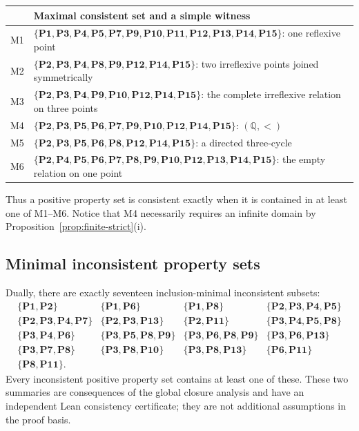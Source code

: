 \documentclass[11pt,a4paper,reqno]{amsart}
\theoremstyle{definition}
\theoremstyle{remark}
\newcommand{\prop}[1]{\textbf{P#1}}
\begin{document}
\begin{center}
\small
\begin{tabular}{@{}cl@{}}
\toprule
 & Maximal consistent set and a simple witness \\
\midrule
M1 &
$\{\prop{1},\prop{3},\prop{4},\prop{5},\prop{7},\prop{9},\prop{10},
\prop{11},\prop{12},\prop{13},\prop{14},\prop{15}\}$:
one reflexive point \\[2pt]
M2 &
$\{\prop{2},\prop{3},\prop{4},\prop{8},\prop{9},\prop{12},\prop{14},
\prop{15}\}$:
two irreflexive points joined symmetrically \\[2pt]
M3 &
$\{\prop{2},\prop{3},\prop{4},\prop{9},\prop{10},\prop{12},\prop{14},
\prop{15}\}$:
the complete irreflexive relation on three points \\[2pt]
M4 &
$\{\prop{2},\prop{3},\prop{5},\prop{6},\prop{7},\prop{9},\prop{10},
\prop{12},\prop{14},\prop{15}\}$:
$(\mathbb{Q},<)$ \\[2pt]
M5 &
$\{\prop{2},\prop{3},\prop{5},\prop{6},\prop{8},\prop{12},\prop{14},
\prop{15}\}$:
a directed three-cycle \\[2pt]
M6 &
$\{\prop{2},\prop{4},\prop{5},\prop{6},\prop{7},\prop{8},\prop{9},
\prop{10},\prop{12},\prop{13},\prop{14},\prop{15}\}$:
the empty relation on one point \\
\bottomrule
\end{tabular}
\end{center}

Thus a positive property set is consistent exactly when it is contained in at
least one of M1--M6.  Notice that M4 necessarily requires an infinite domain
by Proposition~\ref{prop:finite-strict}(i).

\subsection{Minimal inconsistent property sets}

Dually, there are exactly seventeen inclusion-minimal inconsistent subsets:
\[
\begin{array}{llll}
\{\prop{1},\prop{2}\} &
\{\prop{1},\prop{6}\} &
\{\prop{1},\prop{8}\} &
\{\prop{2},\prop{3},\prop{4},\prop{5}\} \\[2pt]
\{\prop{2},\prop{3},\prop{4},\prop{7}\} &
\{\prop{2},\prop{3},\prop{13}\} &
\{\prop{2},\prop{11}\} &
\{\prop{3},\prop{4},\prop{5},\prop{8}\} \\[2pt]
\{\prop{3},\prop{4},\prop{6}\} &
\{\prop{3},\prop{5},\prop{8},\prop{9}\} &
\{\prop{3},\prop{6},\prop{8},\prop{9}\} &
\{\prop{3},\prop{6},\prop{13}\} \\[2pt]
\{\prop{3},\prop{7},\prop{8}\} &
\{\prop{3},\prop{8},\prop{10}\} &
\{\prop{3},\prop{8},\prop{13}\} &
\{\prop{6},\prop{11}\} \\[2pt]
\{\prop{8},\prop{11}\}. &&&
\end{array}
\]
Every inconsistent positive property set contains at least one of these.
These two summaries are consequences of the global closure analysis and have
an independent Lean consistency certificate; they are not additional
assumptions in the proof basis.
\end{document}
